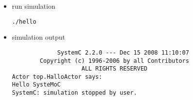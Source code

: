 \begin{frame}[fragile=singleslide]
\begin{itemize}
\item run simulation
\begin{lstlisting}
./hello
\end{lstlisting}
\item simulation output
\begin{lstlisting}
             SystemC 2.2.0 --- Dec 15 2008 11:10:07
        Copyright (c) 1996-2006 by all Contributors
                    ALL RIGHTS RESERVED
Actor top.HalloActor says:
Hello SysteMoC
SystemC: simulation stopped by user.
\end{lstlisting}
\end{itemize}
\end{frame}





